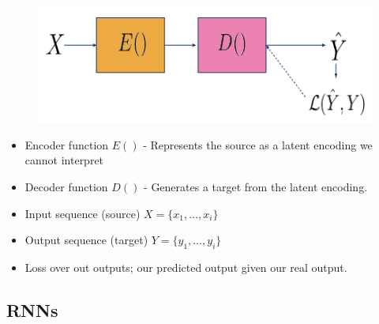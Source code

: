 \documentclass[11pt]{article}
\begin{document}
\begin{figure}[H]
    \centering
    \includegraphics[width=.5\linewidth]{figures/encoder-decoder.png}
\end{figure}

\begin{itemize}
    \item Encoder function $E()$ - Represents the source as a latent encoding we cannot interpret
    \item Decoder function $D()$ - Generates a target from the latent encoding.
    \item Input sequence (source) $X=\{x_1,\dots, x_i\}$
    \item Output sequence (target) $Y=\{y_1,\dots, y_i\}$
    \item Loss over out outputs; our predicted output given our real output.
\end{itemize}

\subsection{RNNs}

\begin{figure}[H]
    \centering
\end{figure}
\end{document}
